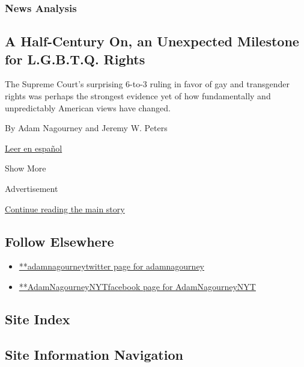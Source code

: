 \begin{enumerate}
  \hypertarget{news-analysis-1}{%
  \subsubsection{News Analysis}\label{news-analysis-1}}

  \hypertarget{a-half-century-on-an-unexpected-milestone-for-lgbtq-rights}{%
  \subsection{A Half-Century On, an Unexpected Milestone for L.G.B.T.Q.
  Rights}\label{a-half-century-on-an-unexpected-milestone-for-lgbtq-rights}}

  The Supreme Court's surprising 6-to-3 ruling in favor of gay and
  transgender rights was perhaps the strongest evidence yet of how
  fundamentally and unpredictably American views have changed.

  By Adam Nagourney and Jeremy W. Peters

  \href{https://www.nytimes.com/es/2020/06/17/espanol/derechos-lgbtq-corte-suprema.html}{Leer
  en español}
\end{enumerate}

Show More

Advertisement

\protect\hyperlink{after-mid2}{Continue reading the main story}

\hypertarget{follow-elsewhere}{%
\subsection{Follow Elsewhere}\label{follow-elsewhere}}

\begin{itemize}
\tightlist
\item
  \href{https://twitter.com/adamnagourney}{**adamnagourneytwitter page
  for adamnagourney}
\item
  \href{https://www.facebook.com/AdamNagourneyNYT}{**AdamNagourneyNYTfacebook
  page for AdamNagourneyNYT}
\end{itemize}

\hypertarget{site-index}{%
\subsection{Site Index}\label{site-index}}

\hypertarget{site-information-navigation}{%
\subsection{Site Information
Navigation}\label{site-information-navigation}}

